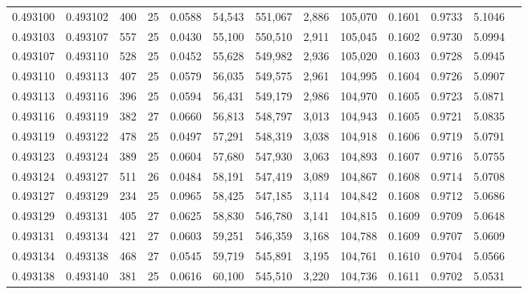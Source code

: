 \begin{tabular}{rrrrrrrrrrrrr}
0.493100 & 0.493102 & 400 &  25 &                                     0.0588 &  54,543 & 551,067 &   2,886 & 105,070 & 0.1601 & 0.9733 & 5.1046 \\
0.493103 & 0.493107 & 557 &  25 &                                     0.0430 &  55,100 & 550,510 &   2,911 & 105,045 & 0.1602 & 0.9730 & 5.0994 \\
0.493107 & 0.493110 & 528 &  25 &                                     0.0452 &  55,628 & 549,982 &   2,936 & 105,020 & 0.1603 & 0.9728 & 5.0945 \\
0.493110 & 0.493113 & 407 &  25 &                                     0.0579 &  56,035 & 549,575 &   2,961 & 104,995 & 0.1604 & 0.9726 & 5.0907 \\
0.493113 & 0.493116 & 396 &  25 &                                     0.0594 &  56,431 & 549,179 &   2,986 & 104,970 & 0.1605 & 0.9723 & 5.0871 \\
0.493116 & 0.493119 & 382 &  27 &                                     0.0660 &  56,813 & 548,797 &   3,013 & 104,943 & 0.1605 & 0.9721 & 5.0835 \\
0.493119 & 0.493122 & 478 &  25 &                                     0.0497 &  57,291 & 548,319 &   3,038 & 104,918 & 0.1606 & 0.9719 & 5.0791 \\
0.493123 & 0.493124 & 389 &  25 &                                     0.0604 &  57,680 & 547,930 &   3,063 & 104,893 & 0.1607 & 0.9716 & 5.0755 \\
0.493124 & 0.493127 & 511 &  26 &                                     0.0484 &  58,191 & 547,419 &   3,089 & 104,867 & 0.1608 & 0.9714 & 5.0708 \\
0.493127 & 0.493129 & 234 &  25 &                                     0.0965 &  58,425 & 547,185 &   3,114 & 104,842 & 0.1608 & 0.9712 & 5.0686 \\
0.493129 & 0.493131 & 405 &  27 &                                     0.0625 &  58,830 & 546,780 &   3,141 & 104,815 & 0.1609 & 0.9709 & 5.0648 \\
0.493131 & 0.493134 & 421 &  27 &                                     0.0603 &  59,251 & 546,359 &   3,168 & 104,788 & 0.1609 & 0.9707 & 5.0609 \\
0.493134 & 0.493138 & 468 &  27 &                                     0.0545 &  59,719 & 545,891 &   3,195 & 104,761 & 0.1610 & 0.9704 & 5.0566 \\
0.493138 & 0.493140 & 381 &  25 &                                     0.0616 &  60,100 & 545,510 &   3,220 & 104,736 & 0.1611 & 0.9702 & 5.0531 \\

\end{tabular}
